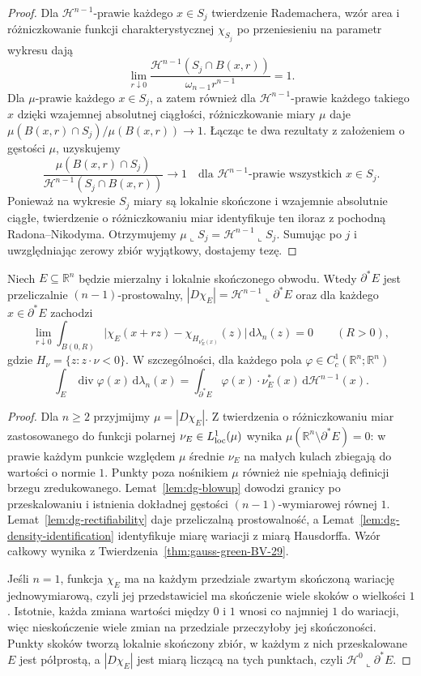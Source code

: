 \begin{proof}
Dla $\mathcal H^{n-1}$-prawie każdego $x\in S_j$
twierdzenie Rademachera, wzór area i
różniczkowanie funkcji charakterystycznej
$\chi_{S_j}$ po przeniesieniu na parametr
wykresu dają
\[
 \lim_{r\downarrow0}
 \frac{\mathcal H^{n-1}(S_j\cap B(x,r))}
 {\omega_{n-1}r^{n-1}}=1.
\]
Dla $\mu$-prawie każdego $x\in S_j$,
a zatem również dla $\mathcal H^{n-1}$-prawie
każdego takiego $x$ dzięki wzajemnej
absolutnej ciągłości, różniczkowanie miary
$\mu$ daje
$\mu(B(x,r)\cap S_j)/\mu(B(x,r))\to1$.
Łącząc te dwa rezultaty z założeniem o gęstości
$\mu$, uzyskujemy
\[
 \frac{\mu(B(x,r)\cap S_j)}
 {\mathcal H^{n-1}(S_j\cap B(x,r))}
 \longrightarrow1
 \quad\text{dla }\mathcal H^{n-1}\text{-prawie wszystkich }x\in S_j.
\]
Ponieważ na wykresie $S_j$ miary są lokalnie
skończone i wzajemnie absolutnie ciągłe,
twierdzenie o różniczkowaniu miar identyfikuje
ten iloraz z pochodną Radona--Nikodyma.
Otrzymujemy $\mu\llcorner S_j=
\mathcal H^{n-1}\llcorner S_j$.
Sumując po $j$ i uwzględniając zerowy zbiór
wyjątkowy, dostajemy tezę.
\end{proof}

\begin{twierdzenie}
\label{thm:de-giorgi-structure-29}
Niech $E\subseteq\mathbb R^n$ będzie mierzalny
i lokalnie skończonego obwodu. Wtedy
$\partial^*E$ jest przeliczalnie $(n-1)$-prostowalny,
$|D\chi_E|=\mathcal H^{n-1}\llcorner\partial^*E$
oraz dla każdego $x\in\partial^*E$ zachodzi
\[
 \lim_{r\downarrow0}\int_{B(0,R)}
 \bigl|\chi_E(x+rz)-\chi_{H_{\nu_E^*(x)}}(z)\bigr|
 \,\mathrm d\lambda_n(z)=0\qquad(R>0),
\]
gdzie $H_\nu=\{z:z\cdot\nu<0\}$.
W szczególności, dla każdego pola
$\varphi\in C_c^1(\mathbb R^n;\mathbb R^n)$
\[
 \int_E\operatorname{div}\varphi(x)\,\mathrm d\lambda_n(x)
 =\int_{\partial^*E}\varphi(x)\cdot\nu_E^*(x)
 \,\mathrm d\mathcal H^{n-1}(x).
\]
\end{twierdzenie}
\begin{proof}
Dla $n\ge2$ przyjmijmy $\mu=|D\chi_E|$.
Z twierdzenia o różniczkowaniu miar zastosowanego
do funkcji polarnej $\nu_E\in L^1_{\rm loc}(\mu)$
wynika
$\mu(\mathbb R^n\setminus\partial^*E)=0$:
w prawie każdym punkcie względem $\mu$
średnie $\nu_E$ na małych kulach zbiegają do
wartości o normie $1$. Punkty poza nośnikiem
$\mu$ również nie spełniają definicji
brzegu zredukowanego.
Lemat~\ref{lem:dg-blowup} dowodzi granicy
po przeskalowaniu i istnienia dokładnej
gęstości $(n-1)$-wymiarowej równej $1$.
Lemat~\ref{lem:dg-rectifiability} daje
przeliczalną prostowalność, a
Lemat~\ref{lem:dg-density-identification}
identyfikuje miarę wariacji z miarą Hausdorffa.
Wzór całkowy wynika z
Twierdzenia~\ref{thm:gauss-green-BV-29}.

Jeśli $n=1$, funkcja $\chi_E$ ma na każdym
przedziale zwartym skończoną wariację
jednowymiarową, czyli jej przedstawiciel
ma skończenie wiele skoków o wielkości $1$.
Istotnie, każda zmiana wartości między
$0$ i $1$ wnosi co najmniej $1$ do wariacji,
więc nieskończenie wiele zmian na przedziale
przeczyłoby jej skończoności. Punkty skoków
tworzą lokalnie skończony zbiór, w każdym z nich
przeskalowane $E$ jest półprostą, a
$|D\chi_E|$ jest miarą liczącą na tych punktach,
czyli $\mathcal H^0\llcorner\partial^*E$.
\end{proof}

